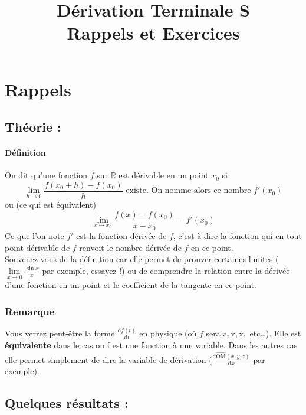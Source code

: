 \documentclass[11pt]{article}
\title{Dérivation Terminale S\\
        \large Rappels et Exercices}
\date{}
\author{}
\newcommand{\R}{\mathbb R}
\begin{document}
    
    \maketitle
    
    \section{Rappels}
        \subsection{Théorie :}
        
        \paragraph{Définition}
        On dit qu'une fonction $f$ sur $\R$ est dérivable en un point $x_0$ si
        \begin{equation}
            \lim\limits_{h \to 0} \frac{f(x_0 + h)-f(x_0)}{h} \text{ existe. On nomme alors ce nombre $f'(x_0)$} 
        \end{equation}
        ou (ce qui est équivalent)
        \begin{equation*}
            \lim\limits_{x \to x_0} \frac{f(x)-f(x_0)}{x-x_0} = f'(x_0)            
        \end{equation*}
        Ce que l'on note $f'$ est la fonction dérivée de $f$, c'est-à-dire la fonction qui en tout point dérivable de $f$ renvoit le nombre dérivée de $f$ en ce point.\\
        Souvenez vous de la définition car elle permet de prouver certaines limites ($\lim\limits_{x \to 0} \frac{\sin{x}}{x}$ par exemple, essayez !) ou de comprendre la relation entre la dérivée d'une fonction en un point et le coefficient de la tangente en ce point.
        \subsubsection*{Remarque}
        Vous verrez peut-être la forme $\frac{\mathrm{d}f(t)}{\mathrm{d}t}$ en physique (où $f$ sera $\mathrm{a}, \mathrm{v}, \mathrm{x},$ etc\dots). Elle est \textbf{équivalente} dans le cas ou f est une fonction à une variable. Dans les autres cas elle permet simplement de dire la variable de dérivation ($\frac{\mathrm{d}\overrightarrow{\mathrm{OM}}(x,y,z)}{\mathrm{d}x}$ par exemple). 

        \subsection{Quelques résultats :}
\end{document}

